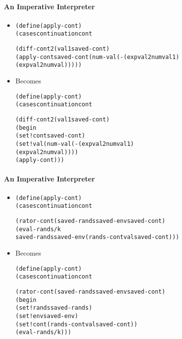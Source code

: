 \documentclass{beamer}
\begin{document}
\begin{frame}[fragile]
\framesubtitle{An Imperative Interpreter}
\begin{scriptsize}
\begin{itemize}
\item<1->
\begin{alltt}
(define (apply-cont)
  (cases continuation cont
    
    (diff-cont2 (val1 saved-cont)
     (apply-cont saved-cont (num-val (- (expval2num val1)
                                        (expval2num val)))))
\end{alltt}

\item<1-> Becomes
\begin{alltt}
(define (apply-cont)
  (cases continuation cont
    
    (diff-cont2 (val1 saved-cont)
                (begin
                  (set! cont saved-cont)
                  (set! val (num-val (- (expval2num val1)
                                        (expval2num val))))
                  (apply-cont)))
\end{alltt}

\end{itemize}
\end{scriptsize}
\end{frame}

\begin{frame}[fragile]
\framesubtitle{An Imperative Interpreter}
\begin{scriptsize}
\begin{itemize}
\item<1->
\begin{alltt}
(define (apply-cont)
  (cases continuation cont
    
    (rator-cont (saved-rands saved-env saved-cont)
     (eval-rands/k 
       saved-rands saved-env (rands-cont val saved-cont)))
\end{alltt}

\item<1-> Becomes
\begin{alltt}
(define (apply-cont)
  (cases continuation cont
    
    (rator-cont (saved-rands saved-env saved-cont)
                (begin
                  (set! rands saved-rands)
                  (set! env saved-env)
                  (set! cont (rands-cont val saved-cont))
                  (eval-rands/k)))
\end{alltt}

\end{itemize}
\end{scriptsize}
\end{frame}
\end{document}
